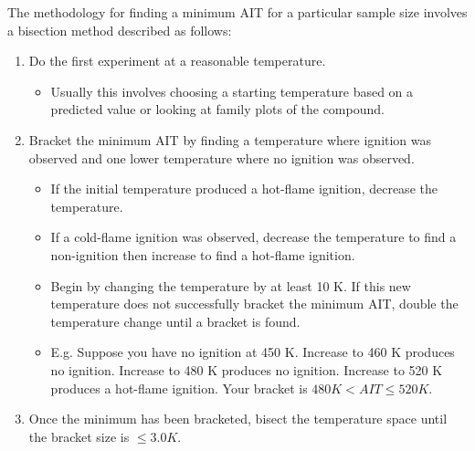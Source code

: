 The methodology for finding a minimum AIT for a particular sample size
involves a bisection method described as follows:

\begin{enumerate}
\def\labelenumi{\arabic{enumi}.}
\tightlist
\item
  Do the first experiment at a reasonable temperature.

  \begin{itemize}
  \tightlist
  \item
    Usually this involves choosing a starting temperature based on a
    predicted value or looking at family plots of the compound.
  \end{itemize}
\item
  Bracket the minimum AIT by finding a temperature where ignition was
  observed and one lower temperature where no ignition was observed.

  \begin{itemize}
  \tightlist
  \item
    If the initial temperature produced a hot-flame ignition, decrease
    the temperature.
  \item
    If a cold-flame ignition was observed, decrease the temperature to
    find a non-ignition then increase to find a hot-flame ignition.
  \item
    Begin by changing the temperature by at least 10 K. If this new
    temperature does not successfully bracket the minimum AIT, double
    the temperature change until a bracket is found.
  \item
    E.g. Suppose you have no ignition at 450 K. Increase to 460 K
    produces no ignition. Increase to 480 K produces no ignition.
    Increase to 520 K produces a hot-flame ignition. Your bracket is
    \(480 K < AIT \leq 520 K\).
  \end{itemize}
\item
  Once the minimum has been bracketed, bisect the temperature space
  until the bracket size is \(\leq 3.0K\).


\end{enumerate}
